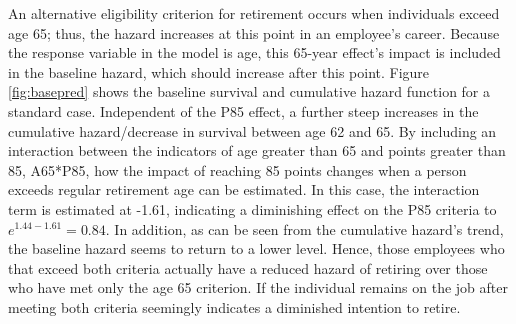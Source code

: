An alternative eligibility criterion for retirement occurs when individuals exceed age 65; thus, the hazard increases at this point in an employee's career. Because the response variable in the model is age, this 65-year effect's impact is included in the baseline hazard, which should increase after this point. Figure \ref{fig:basepred} shows the baseline survival and cumulative hazard function for a standard case. Independent of the P85 effect, a further steep increases in the cumulative hazard/decrease in survival between age 62 and 65. By including an interaction between the indicators of age greater than 65 and points greater than 85, A65*P85, how the impact of reaching 85 points changes when a person exceeds regular retirement age can be estimated. In this case, the interaction term is estimated at -1.61, indicating a diminishing effect on the P85 criteria to $e^{1.44-1.61} =0.84$. In addition, as can be seen from the cumulative hazard's trend, the baseline hazard seems to return to a lower level.  Hence, those employees who that exceed both criteria actually have a reduced hazard of retiring over those who have met only the age 65 criterion. If the individual remains on the job after meeting both criteria seemingly indicates a diminished intention to retire.

